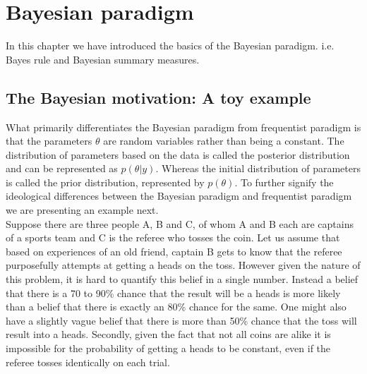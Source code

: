 
\chapter{Bayesian paradigm}
\label{ch : bayesian_paradigm}
In this chapter we have introduced the basics of the Bayesian paradigm. i.e. Bayes rule and Bayesian summary measures. 

\section{The Bayesian motivation: A toy example}
What primarily differentiates the Bayesian paradigm from frequentist paradigm is that the parameters $\theta$ are random variables rather than being a constant. The distribution of parameters based on the data is called the posterior distribution and can be represented as $p(\theta|y)$. Whereas the initial distribution of parameters is called the prior distribution, represented by $p(\theta)$. To further signify the ideological differences between the Bayesian paradigm and frequentist paradigm we are presenting an example next.\\

Suppose there are three people A, B and C, of whom A and B each are captains of a sports team and C is the referee who tosses the coin. Let us assume that based on experiences of an old friend, captain B gets to know that the referee purposefully attempts at getting a heads on the toss. However given the nature of this problem, it is hard to quantify this belief in a single number. Instead a belief that there is a 70 to 90\% chance that the result will be a heads is more likely than a belief that there is exactly an 80\% chance for the same. One might also have a slightly vague belief that there is more than 50\% chance that the toss will result into a heads. Secondly, given the fact that not all coins are alike it is impossible for the probability of getting a heads to be constant, even if the referee tosses identically on each trial.\\

